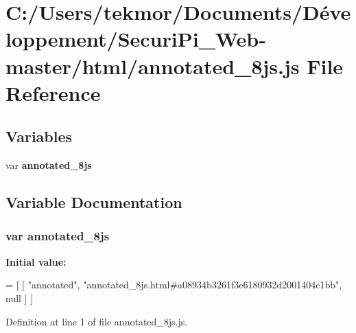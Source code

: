 \section{C\+:/\+Users/tekmor/\+Documents/\+Développement/\+Securi\+Pi\+\_\+\+Web-\/master/html/annotated\+\_\+8js.js File Reference}
\label{annotated__8js_8js}
\subsection*{Variables}
\begin{DoxyCompactItemize}
\item 
var {\bf annotated\+\_\+8js}
\end{DoxyCompactItemize}


\subsection{Variable Documentation}
\subsubsection[{annotated\+\_\+8js}]{\setlength{\rightskip}{0pt plus 5cm}var annotated\+\_\+8js}\label{annotated__8js_8js_a42bc376566df55934ebfdce7fadcd63c}
{\bfseries Initial value\+:}
\begin{DoxyCode}
=
[
    [ \textcolor{stringliteral}{"annotated"}, \textcolor{stringliteral}{"annotated\_8js.html#a08934b3261f3e6180932d2001404c1bb"}, null ]
]
\end{DoxyCode}


Definition at line 1 of file annotated\+\_\+8js.\+js.

